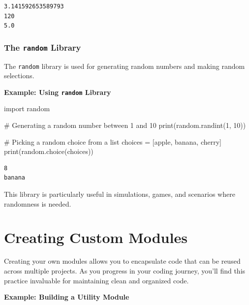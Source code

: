 \documentclass[
  letterpaper,
  DIV=11,
  numbers=noendperiod]{scrreprt}
\newenvironment{Shaded}{\begin{snugshade}}{\end{snugshade}}
\newcommand{\BuiltInTok}[1]{\textcolor[rgb]{0.00,0.23,0.31}{#1}}
\newcommand{\CommentTok}[1]{\textcolor[rgb]{0.37,0.37,0.37}{#1}}
\newcommand{\DecValTok}[1]{\textcolor[rgb]{0.68,0.00,0.00}{#1}}
\newcommand{\ImportTok}[1]{\textcolor[rgb]{0.00,0.46,0.62}{#1}}
\newcommand{\NormalTok}[1]{\textcolor[rgb]{0.00,0.23,0.31}{#1}}
\newcommand{\OperatorTok}[1]{\textcolor[rgb]{0.37,0.37,0.37}{#1}}
\newcommand{\StringTok}[1]{\textcolor[rgb]{0.13,0.47,0.30}{#1}}
\begin{document}
\begin{verbatim}
3.141592653589793
120
5.0
\end{verbatim}

\hypertarget{the-random-library}{%
\subsubsection{\texorpdfstring{The \texttt{random}
Library}{The random Library}}\label{the-random-library}}

The \texttt{random} library is used for generating random numbers and
making random selections.

\textbf{Example: Using \texttt{random} Library}

\begin{Shaded}
\begin{Highlighting}[]
\ImportTok{import}\NormalTok{ random}

\CommentTok{\# Generating a random number between 1 and 10}
\BuiltInTok{print}\NormalTok{(random.randint(}\DecValTok{1}\NormalTok{, }\DecValTok{10}\NormalTok{))  }

\CommentTok{\# Picking a random choice from a list}
\NormalTok{choices }\OperatorTok{=}\NormalTok{ [}\StringTok{\textquotesingle{}apple\textquotesingle{}}\NormalTok{, }\StringTok{\textquotesingle{}banana\textquotesingle{}}\NormalTok{, }\StringTok{\textquotesingle{}cherry\textquotesingle{}}\NormalTok{]}
\BuiltInTok{print}\NormalTok{(random.choice(choices)) }
\end{Highlighting}
\end{Shaded}

\begin{verbatim}
8
banana
\end{verbatim}

This library is particularly useful in simulations, games, and scenarios
where randomness is needed.

\hypertarget{creating-custom-modules}{%
\section{Creating Custom Modules}\label{creating-custom-modules}}

Creating your own modules allows you to encapsulate code that can be
reused across multiple projects. As you progress in your coding journey,
you'll find this practice invaluable for maintaining clean and organized
code.

\textbf{Example: Building a Utility Module}
\end{document}
